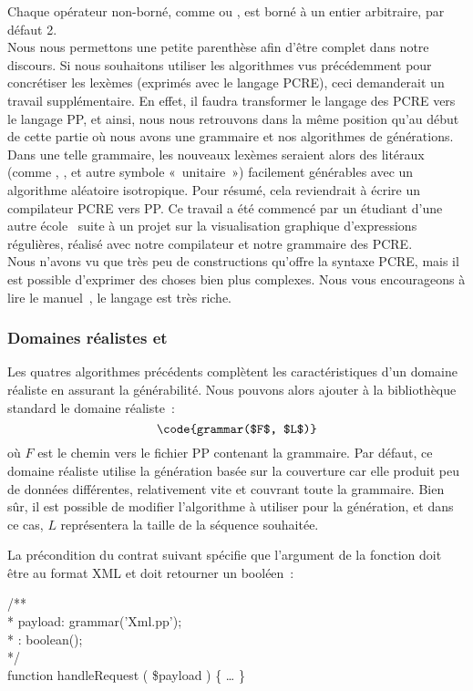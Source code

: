 Chaque opérateur non-borné, comme \code{*} ou \code{+}, est borné à un entier
arbitraire, par défaut 2. \\

Nous nous permettons une petite parenthèse afin d'être complet dans notre
discours. Si nous souhaitons utiliser les algorithmes vus précédemment pour
concrétiser les lexèmes (exprimés avec le langage PCRE), ceci demanderait un
travail supplémentaire. En effet, il faudra transformer le langage des PCRE vers
le langage PP, et ainsi, nous nous retrouvons dans la même position qu'au début
de cette partie où nous avons une grammaire et nos algorithmes de générations.
Dans une telle grammaire, les nouveaux lexèmes seraient alors des litéraux
(comme , ,  et autre symbole «~unitaire~») facilement
générables avec un algorithme aléatoire isotropique. Pour résumé, cela
reviendrait à écrire un compilateur PCRE vers PP. Ce travail a été commencé par
un étudiant d'une autre école~ suite à un projet sur la
visualisation graphique d'expressions régulières, réalisé avec notre compilateur
et notre grammaire des PCRE. \\

Nous n'avons vu que très peu de constructions qu'offre la syntaxe PCRE, mais il
est possible d'exprimer des choses bien plus complexes. Nous vous encourageons à
lire le manuel~, le langage est très riche.

\subsubsection{Domaines réalistes  et }

Les quatres algorithmes précédents complètent les caractéristiques d'un domaine
réaliste en assurant la générabilité. Nous pouvons alors ajouter à la
bibliothèque standard le domaine réaliste~:
%
$$\code{grammar($F$, $L$)}$$
%
où $F$ est le chemin vers le fichier PP contenant la grammaire. Par défaut, ce
domaine réaliste utilise la génération basée sur la couverture car elle produit
peu de données différentes, relativement vite et couvrant toute la grammaire.
Bien sûr, il est possible de modifier l'algorithme à utiliser pour la
génération, et dans ce cas, $L$ représentera la taille de la séquence souhaitée.

\begin{example}

La précondition du contrat suivant spécifie que l'argument  de
la fonction  doit être au format XML et doit retourner
un booléen~:

\begin{pre}
/** \\
 * \arequires payload: grammar('Xml.pp'); \\
 * \aensures  \aresult: boolean(); \\
 */ \\
function handleRequest ( \$payload ) \{ … \}
\end{pre}

\end{example}

